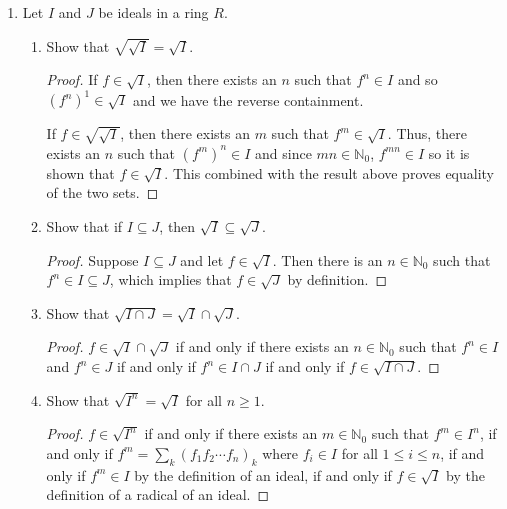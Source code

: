 \documentclass[11pt,oneside,english]{amsart}
\theoremstyle{definition}
\newcommand{\MB}[1]{\mathbb{#1}}
\newcommand{\MF}[1]{\mathfrak{#1}}
\begin{document}
\begin{enumerate}[leftmargin=*]
\begin{proof}
By the spectrum analogue of the strong Nullstellensatz, we know that $\displaystyle \sqrt{I}=\bigcap_{\MF{p}\in V(I)}\MF{p}$. We also know that
\[
\bigcap_{\MF{p}\in V(I)}\MF{p}\subseteq \bigcap_{\MF{q}\in \text{Min}(I)}\MF{q},
\]
since  $\text{Min}(I)\subseteq V(I)$. To show the reverse containment, recall the conclusion from the previous part of this problem: the set of all prime ideals that contain $I$ is the union of all the minimal prime ideals that contain $I$. Therefore the intersection of all the minimal prime ideals containing $I$ must be contained in the intersection of all the prime ideals of $I$. So finally, 
\[
\sqrt{I}=\bigcap_{\MF{p}\in V(I)}\MF{p}= \bigcap_{\MF{q}\in \text{Min}(I)}\MF{q},
\]
\end{proof}



\item Let $I$ and $J$ be ideals in a ring $R$.
\begin{enumerate}
\item Show that $\sqrt{\sqrt{I}} = \sqrt{I}$.
\begin{proof}
If $f\in \sqrt{I}$, then there exists an $n$ such that $f^n\in I$ and so $(f^n)^1\in \sqrt{I}$ and we have the reverse containment.

If $f\in \sqrt{\sqrt{I}}$, then there exists an $m$ such that $f^m\in \sqrt{I}$. Thus, there exists an $n$ such that $(f^m)^n\in I$ and since $mn\in \MB{N}_0$, $f^{mn}\in I$ so it is shown that $f\in \sqrt{I}$. This combined with the result above proves equality of the two sets.
\end{proof}

\item Show that if $I \subseteq J$, then $\sqrt{I} \subseteq \sqrt{J}$.
\begin{proof}
Suppose $I\subseteq J$ and let $f\in \sqrt{I}$. Then there is an $n\in\MB{N}_0$ such that $f^n\in I\subseteq J$, which implies that $f\in \sqrt{J}$ by definition.
\end{proof}

\item Show that $\sqrt{I \cap J} = \sqrt{I} \cap \sqrt{J}$.
\begin{proof}
$f\in \sqrt{I} \cap \sqrt{J}$ if and only if there exists an $n\in\MB{N}_0$ such that $f^n\in I$ and $f^n\in J$ if and only if $f^n\in I\cap J$ if and only if $f\in \sqrt{I \cap J}$.
\end{proof}

\item Show that $\sqrt{I^n} = \sqrt{I}$ for all $n \geq1$.
\begin{proof}
$f\in \sqrt{I^n}$ if and only if there exists an $m\in \MB{N}_0$ such that $f^m\in I^n$, if and only if $f^m=\sum_k(f_1f_2\cdots f_n)_k$ where $f_i\in I$ for all $1\leq i\leq n$, if and only if $f^m\in I$ by the definition of an ideal, if and only if $f\in \sqrt{I}$ by the definition of a radical of an ideal.
\end{proof}


\end{enumerate}
\end{enumerate}
\end{document}

